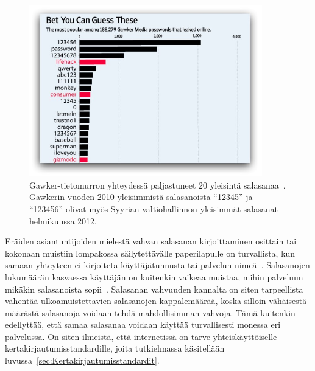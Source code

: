 \documentclass[finnish,gradu]{tktltiki}
\begin{document}
  \begin{figure}
    \centering
    \includegraphics[width=0.9\textwidth]{images/gawker_top20_passwords.jpg}
    \caption{Gawker-tietomurron yhteydessä paljastuneet 20 yleisintä salasanaa~\cite{wsj_gawker_12_2010}. Gawkerin vuoden 2010 yleisimmistä salasanoista ``12345'' ja ``123456'' olivat myös Syyrian valtiohallinnon yleisimmät salasanat helmikuussa 2012.}
    \label{fig:gawker_top20_passwords}
  \end{figure}

  Eräiden asiantuntijoiden mielestä vahvan salasanan kirjoittaminen osittain tai kokonaan muistiin lompakossa säilytettävälle paperilapulle on turvallista, kun samaan yhteyteen ei kirjoiteta käyttäjätunnusta tai palvelun nimeä~\cite{fsecure_passwords_on_postit_09, microsoft_guru_write_your_password_05, schneier_changing_passwords_10, schneier_choosing_passwords_07, schneier_write_down_your_password_05}. Salasanojen lukumäärän kasvaessa käyttäjän on kuitenkin vaikeaa muistaa, mihin palveluun mikäkin salasanoista sopii~\cite{study_of_passwords_07}. Salasanan vahvuuden kannalta on siten tarpeellista vähentää ulkoamuistettavien salasanojen kappalemäärää, koska silloin vähäisestä määrästä salasanoja voidaan tehdä mahdollisimman vahvoja. Tämä kuitenkin edellyttää, että samaa salasanaa voidaan käyttää turvallisesti monessa eri palvelussa. On siten ilmeistä, että internetissä on tarve yhteiskäyttöiselle kertakirjautumisstandardille, joita tutkielmassa käsitellään luvussa~\ref{sec:Kertakirjautumisstandardit}.

\end{document}
